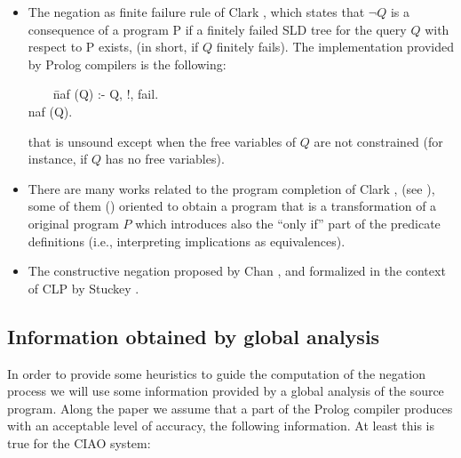 \documentclass[]{llncs}
\newenvironment{mytabbing}
   {\vspace{0.3em}\begin{small}\begin{tabbing}}
   {\end{tabbing}\end{small}\vspace{0.3em}}
\begin{document}
\begin{itemize}
\item The negation as finite failure rule of Clark \cite{Clark}, which
  states that $\neg Q$ is a consequence of a program P if a finitely
  failed SLD tree for the query $Q$ with respect to P exists, (in
  short, if $Q$ finitely fails). The implementation provided by Prolog
  compilers is the following:

\begin{tt}
\begin{mytabbing}
~~~~\= naf (Q) :- Q, !, fail. \\
    \> naf (Q).
\end{mytabbing}
\end{tt}

\noindent
that is unsound except when the free variables of $Q$ are not 
constrained (for instance, if  $Q$ has
no free variables).

\item There are many works related to the program completion of
Clark \cite{Clark}, (see \cite{Lloyd,Apt}), some of them
(\cite{Barbuti1,Barbuti2}) oriented to obtain a program
that is a transformation of a original program $P$ which
introduces also the ``only if'' part of the predicate
definitions (i.e., interpreting implications as equivalences).


\item The constructive negation proposed by Chan
\cite{Chan1,Chan2}, and formalized in the context of CLP
by Stuckey \cite{Stuckey}.
\end{itemize}



\subsection{Information obtained by global analysis}
In order to provide some heuristics to guide the computation
of the negation process we will use some information provided
by a global analysis of the source program.
Along the paper we assume that a part of the Prolog compiler
produces with an acceptable level of accuracy, the following information.
At least this is true for the CIAO system:
\end{document}

